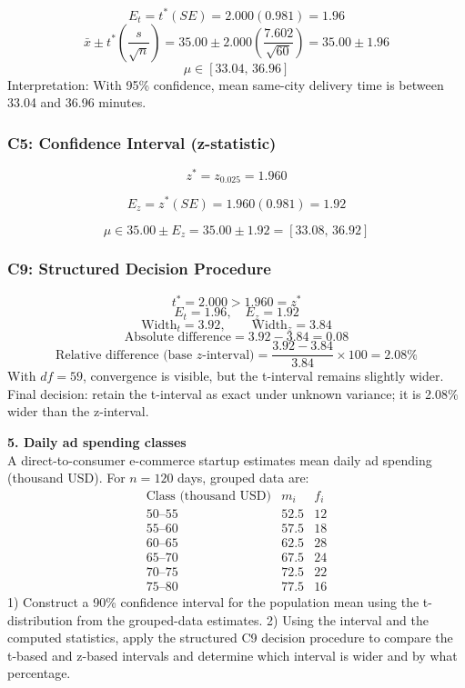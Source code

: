 \begin{ExamProblems}
		\[
		E_t=t^*(SE)=2.000(0.981)=1.96
		\]
		\[
		\bar{x}\pm t^*\left(\frac{s}{\sqrt{n}}\right)=35.00\pm 2.000\left(\frac{7.602}{\sqrt{60}}\right)=35.00\pm 1.96
		\]
		\[
		\mu\in[33.04,\,36.96]
		\]
		Interpretation: With 95\% confidence, mean same-city delivery time is between 33.04 and 36.96 minutes.

		\subsubsection*{C5: Confidence Interval (z-statistic)}
		\[
		z^*=z_{0.025}=1.960
		\]

		\[
		E_z=z^*(SE)=1.960(0.981)=1.92
		\]

		\[
		\mu\in 35.00\pm E_z=35.00\pm 1.92=[33.08,\,36.92]
		\]

		\subsubsection*{C9: Structured Decision Procedure}
		\[
		t^*=2.000>1.960=z^*
		\]
		\[
		E_t=1.96,\quad E_z=1.92
		\]
		\[
		\text{Width}_t=3.92,\qquad \text{Width}_z=3.84
		\]
		\[
		\text{Absolute difference}=3.92-3.84=0.08
		\]
		\[
		\text{Relative difference (base }z\text{-interval)}=\frac{3.92-3.84}{3.84}\times 100=2.08\%
		\]
		With $df=59$, convergence is visible, but the t-interval remains slightly wider.
		Final decision: retain the t-interval as exact under unknown variance; it is 2.08\% wider than the z-interval.

		\newpage
		\item
		\textbf{5. Daily ad spending classes}\\
		A direct-to-consumer e-commerce startup estimates mean daily ad spending (thousand USD).
		For $n=120$ days, grouped data are:
		\[
		\begin{array}{c|c|c}
		\text{Class (thousand USD)} & m_i & f_i\\\hline
		50\text{--}55 & 52.5 & 12\\
		55\text{--}60 & 57.5 & 18\\
		60\text{--}65 & 62.5 & 28\\
		65\text{--}70 & 67.5 & 24\\
		70\text{--}75 & 72.5 & 22\\
		75\text{--}80 & 77.5 & 16
		\end{array}
		\]
		1) Construct a 90\% confidence interval for the population mean using the t-distribution from the grouped-data estimates.
		2) Using the interval and the computed statistics, apply the structured C9 decision procedure to compare the t-based and z-based intervals and determine which interval is wider and by what percentage.


\end{ExamProblems}
